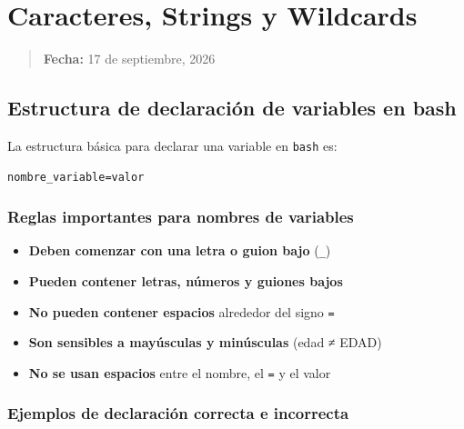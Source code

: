 \documentclass[
  spanish,
  12pt,
  letterpaper,
  DIV=11,
  numbers=noendperiod]{scrreprt}
\begin{document}
\chapter{Caracteres, Strings y
Wildcards}\label{caracteres-strings-y-wildcards}

\begin{quote}
\textbf{Fecha:} 17 de septiembre, 2026
\end{quote}

\section{Estructura de declaración de variables en
bash}\label{estructura-de-declaraciuxf3n-de-variables-en-bash}

La estructura básica para declarar una variable en \texttt{bash} es:

\begin{verbatim}
nombre_variable=valor
\end{verbatim}

\subsection{Reglas importantes para nombres de
variables}\label{reglas-importantes-para-nombres-de-variables}

\begin{tcolorbox}[enhanced jigsaw, arc=.35mm, bottomrule=.15mm, breakable, colback=white, colframe=quarto-callout-important-color-frame, left=2mm, leftrule=.75mm, opacityback=0, rightrule=.15mm, toprule=.15mm]

\begin{itemize}
\item
  \textbf{Deben comenzar con una letra o guion bajo} (\texttt{\_})
\item
  \textbf{Pueden contener letras, números y guiones bajos}
\item
  \textbf{No pueden contener espacios} alrededor del signo \texttt{=}
\item
  \textbf{Son sensibles a mayúsculas y minúsculas} (edad ≠ EDAD)
\item
  \textbf{No se usan espacios} entre el nombre, el \texttt{=} y el valor
\end{itemize}

\end{tcolorbox}

\subsection{Ejemplos de declaración correcta e
incorrecta}\label{ejemplos-de-declaraciuxf3n-correcta-e-incorrecta}
\end{document}
